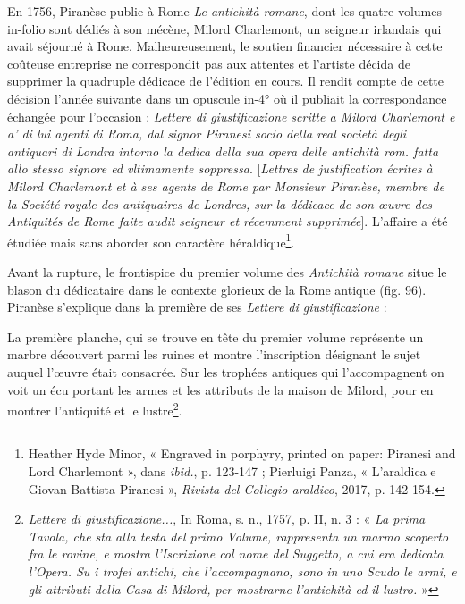 \documentclass[12pt,twoside,openany]{book}
\renewenvironment{quote}
  {%
    \par\begingroup
    \fontsize{11pt}{14pt}\selectfont
    \list{}{\leftmargin=1.5em\rightmargin=1.5em}%
    \item\relax
  }
  {%
    \endlist
    \endgroup
  }
\newenvironment{PurhBlockQuote}
  {%
    \begin{quote}
  }
  {%
    \end{quote}
  }
\begin{document}
En 1756, Piranèse publie à Rome \textit{Le antichità romane}, dont les quatre volumes in-folio sont dédiés à son mécène, Milord Charlemont, un seigneur irlandais qui avait séjourné à Rome. Malheureusement, le soutien financier nécessaire à cette coûteuse entreprise ne correspondit pas aux attentes et l’artiste décida de supprimer la quadruple dédicace de l’édition en cours. Il rendit compte de cette décision l’année suivante dans un opuscule in-4° où il publiait la correspondance échangée pour l’occasion : \textit{Lettere di giustificazione scritte a Milord Charlemont e a’ di lui agenti di Roma, dal signor Piranesi socio della real società degli antiquari di Londra intorno la dedica della sua opera delle antichità rom. fatta allo stesso signore ed vltimamente soppressa}. [\textit{Lettres de justification écrites à Milord Charlemont et à ses agents de Rome par Monsieur Piranèse, membre de la Société royale des antiquaires de Londres, sur la dédicace de son œuvre des Antiquités de Rome faite audit seigneur et récemment supprimée}]. L’affaire a été étudiée mais sans aborder son caractère héraldique\footnote{Heather Hyde Minor, « Engraved in porphyry, printed on paper: Piranesi and Lord Charlemont », dans \textit{ibid.}, p. 123-147 ; Pierluigi Panza, « L’araldica e Giovan Battista Piranesi », \textit{Rivista del Collegio araldico}, 2017, p. 142-154.}.

Avant la rupture, le frontispice du premier volume des \textit{Antichità romane} situe le blason du dédicataire dans le contexte glorieux de la Rome antique (fig. 96). Piranèse s’explique dans la première de ses \textit{Lettere di giustificazione} :

\begin{PurhBlockQuote}
La première planche, qui se trouve en tête du premier volume représente un marbre découvert parmi les ruines et montre l’inscription désignant le sujet auquel l’œuvre était consacrée. Sur les trophées antiques qui l’accompagnent on voit un écu portant les armes et les attributs de la maison de Milord, pour en montrer l’antiquité et le lustre\footnote{\textit{Lettere di giustificazione...}, In Roma, s. n., 1757, p. II, n. 3 : « \textit{La prima Tavola, che sta alla testa del primo Volume, rappresenta un marmo scoperto fra le rovine, e mostra l’Iscrizione col nome del Suggetto, a cui era dedicata l’Opera. Su i trofei antichi, che l’accompagnano, sono in uno Scudo le armi, e gli attributi della Casa di Milord, per mostrarne l’antichità ed il lustro.} »}.
\end{PurhBlockQuote}
\end{document}
